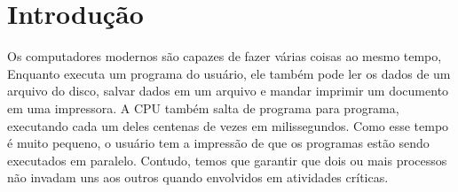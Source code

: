 \chapter{Introdução}

Os computadores modernos são capazes de fazer várias coisas ao mesmo tempo, Enquanto executa um
programa do usuário, ele também pode ler os dados de um arquivo do disco, salvar dados em um arquivo
e mandar imprimir um documento em uma impressora. A CPU também salta de programa para programa, executando
cada um deles centenas de vezes em milissegundos. Como esse tempo é muito pequeno, o usuário tem a impressão 
de que os programas estão sendo executados em paralelo. Contudo, temos que garantir que dois ou mais processos não
invadam uns aos outros quando envolvidos em atividades críticas.
